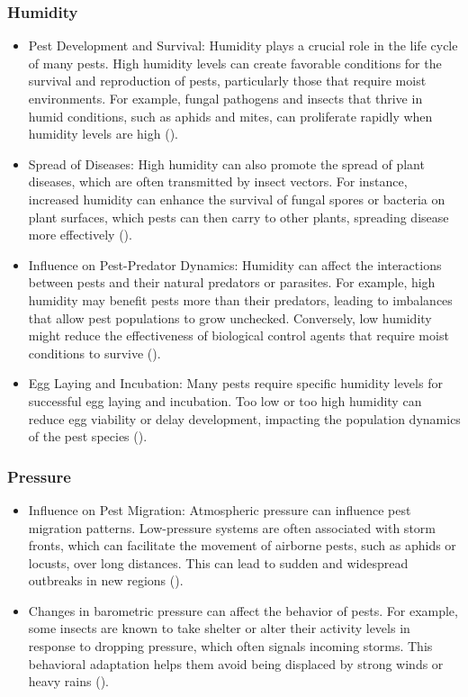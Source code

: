 \subsubsection{Humidity}
        \begin{itemize}
        \item Pest Development and Survival: Humidity plays a crucial role in the life cycle of many pests. High humidity levels can create favorable conditions for the survival and reproduction of pests, particularly those that require moist environments. For example, fungal pathogens and insects that thrive in humid conditions, such as aphids and mites, can proliferate rapidly when humidity levels are high  (\cite{climate2}).
        \item  Spread of Diseases: High humidity can also promote the spread of plant diseases, which are often transmitted by insect vectors. For instance, increased humidity can enhance the survival of fungal spores or bacteria on plant surfaces, which pests can then carry to other plants, spreading disease more effectively (\cite{climate2}).
        \item Influence on Pest-Predator Dynamics: Humidity can affect the interactions between pests and their natural predators or parasites. For example, high humidity may benefit pests more than their predators, leading to imbalances that allow pest populations to grow unchecked. Conversely, low humidity might reduce the effectiveness of biological control agents that require moist conditions to survive (\cite{climate2}).
        \item Egg Laying and Incubation: Many pests require specific humidity levels for successful egg laying and incubation. Too low or too high humidity can reduce egg viability or delay development, impacting the population dynamics of the pest species (\cite{climate2}).
        \end{itemize}
\subsubsection{Pressure}
        \begin{itemize}
        \item Influence on Pest Migration: Atmospheric pressure can influence pest migration patterns. Low-pressure systems are often associated with storm fronts, which can facilitate the movement of airborne pests, such as aphids or locusts, over long distances. This can lead to sudden and widespread outbreaks in new regions (\cite{climate3}).
        \item  Changes in barometric pressure can affect the behavior of pests. For example, some insects are known to take shelter or alter their activity levels in response to dropping pressure, which often signals incoming storms. This behavioral adaptation helps them avoid being displaced by strong winds or heavy rains (\cite{climate2}).
        \end{itemize}
